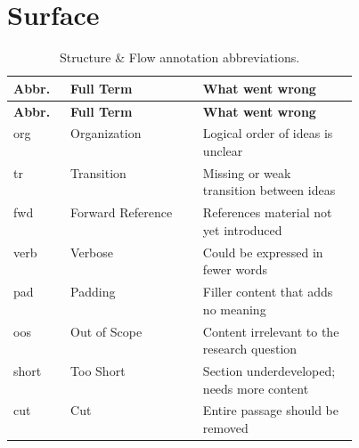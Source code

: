 \documentclass{../sharedAssets/tufte}
\begin{document}
\section{Surface}

\begin{longtable}{@{\extracolsep{\fill}}llp{0.45\linewidth}}
  \caption{Structure \& Flow annotation abbreviations.}\\
  \toprule
  \textbf{Abbr.} & \textbf{Full Term} & \textbf{What went wrong} \\
  \midrule
  \endfirsthead
  \toprule
  \textbf{Abbr.} & \textbf{Full Term} & \textbf{What went wrong} \\
  \midrule
  \endhead
  \bottomrule
  \endlastfoot
  org   & Organization      & Logical order of ideas is unclear \\
  tr    & Transition        & Missing or weak transition between ideas \\
  fwd   & Forward Reference & References material not yet introduced \\
  verb  & Verbose           & Could be expressed in fewer words \\
  pad   & Padding           & Filler content that adds no meaning \\
  oos   & Out of Scope      & Content irrelevant to the research question \\
  short & Too Short         & Section underdeveloped; needs more content \\
  cut   & Cut               & Entire passage should be removed \\
\end{longtable}
\end{document}
